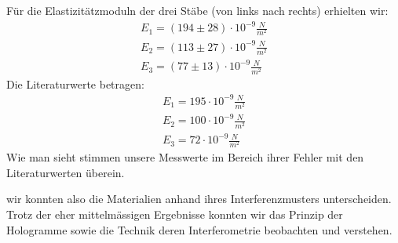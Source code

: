 \documentclass[12pt]{article}
\begin{document}
Für die Elastizitätzmoduln der drei Stäbe (von links nach rechts) erhielten wir:
\begin{align*}
 E_1 = (194 \pm 28) \cdot 10^{-9} \frac{N}{m^2}\\
 E_2 = (113 \pm 27) \cdot 10^{-9} \frac{N}{m^2}\\
 E_3 = (77  \pm 13) \cdot 10^{-9} \frac{N}{m^2}
\end{align*}
Die Literaturwerte betragen:
\begin{align*}
 E_1 = 195  \cdot 10^{-9} \frac{N}{m^2}\\
 E_2 = 100  \cdot 10^{-9} \frac{N}{m^2}\\
 E_3 = 72   \cdot 10^{-9} \frac{N}{m^2}
\end{align*}
Wie man sieht stimmen unsere Messwerte im Bereich ihrer Fehler mit den Literaturwerten überein.

wir konnten also die Materialien anhand ihres Interferenzmusters unterscheiden. Trotz der eher mittelmässigen Ergebnisse konnten wir das Prinzip der Hologramme 
sowie die Technik deren Interferometrie beobachten und verstehen.



%
\end{document}
